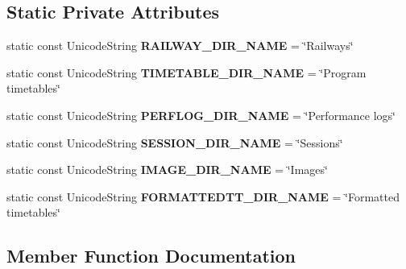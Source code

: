 \subsection*{Static Private Attributes}
\begin{DoxyCompactItemize}
\item 
\mbox{\label{class_t_interface_ac1f7b61cf25b7d795b86b6982118bcbd}} 
static const Unicode\+String {\bfseries R\+A\+I\+L\+W\+A\+Y\+\_\+\+D\+I\+R\+\_\+\+N\+A\+ME} = \char`\"{}Railways\char`\"{}
\item 
\mbox{\label{class_t_interface_a58d5715010ca22036664d614dcc07ff4}} 
static const Unicode\+String {\bfseries T\+I\+M\+E\+T\+A\+B\+L\+E\+\_\+\+D\+I\+R\+\_\+\+N\+A\+ME} = \char`\"{}Program timetables\char`\"{}
\item 
\mbox{\label{class_t_interface_a29c5e8258b9cb9a6e14ec0d26c597d32}} 
static const Unicode\+String {\bfseries P\+E\+R\+F\+L\+O\+G\+\_\+\+D\+I\+R\+\_\+\+N\+A\+ME} = \char`\"{}Performance logs\char`\"{}
\item 
\mbox{\label{class_t_interface_a3671a724b8aa1301f9e03d5959b32f6a}} 
static const Unicode\+String {\bfseries S\+E\+S\+S\+I\+O\+N\+\_\+\+D\+I\+R\+\_\+\+N\+A\+ME} = \char`\"{}Sessions\char`\"{}
\item 
\mbox{\label{class_t_interface_aa6ddfb4160911b095b9ff3ed495ef84c}} 
static const Unicode\+String {\bfseries I\+M\+A\+G\+E\+\_\+\+D\+I\+R\+\_\+\+N\+A\+ME} = \char`\"{}Images\char`\"{}
\item 
\mbox{\label{class_t_interface_a36dd80538dbd99383fae24c49961c21a}} 
static const Unicode\+String {\bfseries F\+O\+R\+M\+A\+T\+T\+E\+D\+T\+T\+\_\+\+D\+I\+R\+\_\+\+N\+A\+ME} = \char`\"{}Formatted timetables\char`\"{}
\end{DoxyCompactItemize}


\subsection{Member Function Documentation}
\mbox{\label{class_t_interface_a27f00bc593500756b06fb2aeae9d28e1}} 
